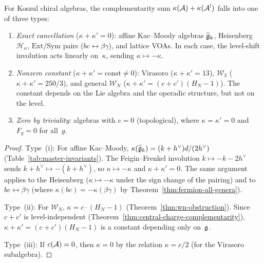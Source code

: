 \begin{proposition}\label{prop:complementarity-classification}
For Koszul chiral algebras, the complementarity sum
$\kappa(\mathcal{A}) + \kappa(\mathcal{A}^!)$ falls into one of three types:
\begin{enumerate}[label=\textup{(\roman*)}]
\item \emph{Exact cancellation}
($\kappa + \kappa' = 0$):
affine Kac--Moody algebras $\widehat{\mathfrak{g}}_k$,
Heisenberg $\mathcal{H}_\kappa$,
$\mathrm{Ext}/\mathrm{Sym}$ pairs
($bc \leftrightarrow \beta\gamma$),
and lattice VOAs.  In each case, the level-shift involution
acts linearly on~$\kappa$, sending
$\kappa \mapsto -\kappa$.
\item \emph{Nonzero constant}
($\kappa + \kappa' = \text{const} \neq 0$):
Virasoro ($\kappa + \kappa' = 13$),
$\mathcal{W}_3$ ($\kappa + \kappa' = 250/3$),
and general $\mathcal{W}_N$
($\kappa + \kappa' = (c+c')(H_N - 1)$).
The constant depends on the Lie algebra and the
operadic structure, but not on the level.
\item \emph{Zero by triviality}:
algebras with $c = 0$ (topological), where
$\kappa = \kappa' = 0$ and $F_g = 0$ for all~$g$.
\end{enumerate}
\end{proposition}

\begin{proof}
Type~(i):  For affine Kac--Moody, $\kappa(\widehat{\mathfrak{g}}_k)
= (k + h^\vee) d / (2h^\vee)$
(Table~\ref{tab:master-invariants}).  The Feigin--Frenkel
involution $k \mapsto -k - 2h^\vee$ sends
$k + h^\vee \mapsto -(k + h^\vee)$, so
$\kappa \mapsto -\kappa$ and $\kappa + \kappa' = 0$.
The same argument applies to the Heisenberg ($\kappa \mapsto
-\kappa$ under the sign change of the pairing) and to
$bc \leftrightarrow \beta\gamma$ (where
$\kappa(bc) = -\kappa(\beta\gamma)$ by
Theorem~\ref{thm:fermion-all-genera}).

Type~(ii): For $\mathcal{W}_N$,
$\kappa = c \cdot (H_N - 1)$
(Theorem~\ref{thm:wn-obstruction}).
Since $c + c'$ is level-independent
(Theorem~\ref{thm:central-charge-complementarity}),
$\kappa + \kappa' = (c + c')(H_N - 1)$ is a constant
depending only on~$\mathfrak{g}$.

Type~(iii): If $c(\mathcal{A}) = 0$, then $\kappa = 0$ by the
relation $\kappa = c/2$ (for the Virasoro subalgebra).
\end{proof}

